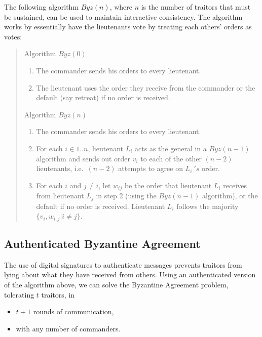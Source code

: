 The following algorithm \(Byz(n)\), where \(n\) is the number of traitors that must be sustained, can be used to maintain interactive consistency. The algorithm works by essentially have the lieutenants vote by treating each others' orders as votes:

\begin{quote}
Algorithm \(Byz(0)\)\\
\begin{enumerate}
\setlength{\itemsep}{0pt}\setlength{\topsep}{0pt}

\item The commander sends his orders to every lieutenant.

\item The lieutenant uses the order they receive from the commander or
the default (say retreat) if no order is received. 

\end{enumerate}

Algorithm \(Byz(n)\)\\
\begin{enumerate}
\setlength{\itemsep}{0pt}\setlength{\topsep}{0pt}

\item The commander sends his orders to every lieutenant. 


\item For each \(i \in 1.. n\), lieutenant \(L_i\) acts as the general in a \(Byz(n-1)\) algorithm and sends out order \(v_i\) to each of the other \((n-2)\)  lieutenants, i.e.\ \((n-2)\) attempts to agree on \(L_i\ 's\) order.

\item For each \(i\) and \(j \not = i\), let \(w_{ij}\) be the order
that lieutenant \(L_i\) receives from lieutenant \(L_j\) in step 2
(using the \(Byz(n-1)\) algorithm), or the default if no order is
received.  Lieutenant \(L_i\) follows the majority \(\{v_i,
w_{i,j}|i\not = j\}\).

\end{enumerate}

\end{quote}

\subsection{Authenticated Byzantine Agreement}
The use of digital signatures to authenticate messages prevents traitors from lying about what they have received from others.  Using an authenticated version of the algorithm above, we can solve the Byzantine Agreement problem, tolerating $t$ traitors, in
\begin{itemize}
\item $t+1$ rounds of communication, 
\item with any number of commanders.
\end{itemize}

